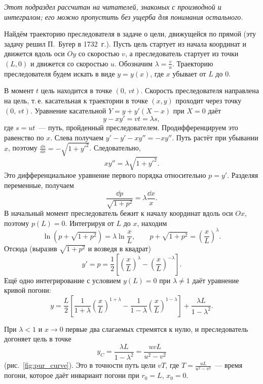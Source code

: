 \documentclass[../main.tex]{subfiles}
\begin{document}
\textit{Этот подраздел рассчитан на читателей, знакомых с производной и интегралом;
его можно пропустить без ущерба для понимания остального.}

Найдём траекторию преследователя в задаче о цели, движущейся по прямой (эту задачу
решил П.~Бугер в 1732~г.). Пусть цель стартует из начала координат и движется вдоль
оси $Oy$ со скоростью $v$, а преследователь стартует из точки $(L, 0)$ и движется со
скоростью $u$. Обозначим $\lambda = \frac{v}{u}$. Траекторию преследователя будем
искать в виде $y = y(x)$, где $x$ убывает от $L$ до $0$.

В момент $t$ цель находится в точке $(0,\, vt)$. Скорость преследователя направлена
на цель, т.\,е. касательная к траектории в точке $(x, y)$ проходит через точку
$(0,\, vt)$. Уравнение касательной $Y = y + y'(X - x)$ при $X = 0$ даёт
\[
y - xy' = vt = \lambda s,
\]
где $s = ut$~--- путь, пройденный преследователем. Продифференцируем это равенство
по $x$. Слева получаем $y' - y' - xy'' = -xy''$. Путь растёт при убывании $x$,
поэтому $\frac{\dd{s}}{\dd{x}} = -\sqrt{1 + y'^2}$. Следовательно,
\[
xy'' = \lambda\sqrt{1 + y'^2}.
\]
Это дифференциальное уравнение первого порядка относительно $p = y'$. Разделяя
переменные, получаем
\[
\frac{\dd{p}}{\sqrt{1 + p^2}} = \lambda\frac{\dd{x}}{x}.
\]
В начальный момент преследователь бежит к началу координат вдоль оси $Ox$, поэтому
$p(L) = 0$. Интегрируя от $L$ до $x$, находим
\[
\ln\left(p + \sqrt{1 + p^2}\right) = \lambda\ln\frac{x}{L},
\qquad
p + \sqrt{1 + p^2} = \left(\frac{x}{L}\right)^{\lambda}.
\]
Отсюда (выразив $\sqrt{1 + p^2}$ и возведя в квадрат)
\[
y' = p = \frac{1}{2}\left[\left(\frac{x}{L}\right)^{\lambda} - \left(\frac{x}{L}\right)^{-\lambda}\right].
\]
Ещё одно интегрирование с условием $y(L) = 0$ при $\lambda \neq 1$ даёт уравнение
кривой погони:
\[
y = \frac{L}{2}\left[\frac{1}{1 + \lambda}\left(\frac{x}{L}\right)^{1 + \lambda}
- \frac{1}{1 - \lambda}\left(\frac{x}{L}\right)^{1 - \lambda}\right]
+ \frac{\lambda L}{1 - \lambda^2}.
\]


При $\lambda < 1$ и $x \to 0$ первые два слагаемых стремятся к нулю, и
преследователь догоняет цель в точке
\[
y_C = \frac{\lambda L}{1 - \lambda^2} = \frac{uvL}{u^2 - v^2}
\]
(рис.~\ref{fig:pur_curve}). Это в точности путь цели $vT$, где $T = \frac{uL}{u^2 - v^2}$~---
время погони, которое даёт инвариант погони при $r_0 = L$, $x_0 = 0$.
\end{document}
